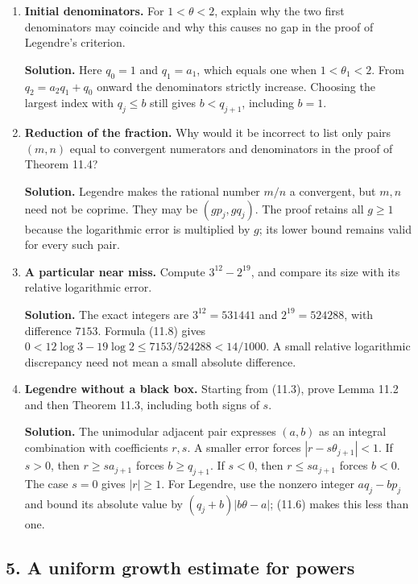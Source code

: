\documentclass[
  11pt,
  a4paper,
]{article}
\begin{document}
\begin{enumerate}
\def\labelenumi{\arabic{enumi}.}
\item
  \textbf{Initial denominators.} For \(1<\theta<2\), explain why the two
  first denominators may coincide and why this causes no gap in the
  proof of Legendre's criterion.

  \textbf{Solution.} Here \(q_0=1\) and \(q_1=a_1\), which equals one
  when \(1<\theta_1<2\). From \(q_2=a_2q_1+q_0\) onward the denominators
  strictly increase. Choosing the largest index with \(q_j\le b\) still
  gives \(b<q_{j+1}\), including \(b=1\).
\item
  \textbf{Reduction of the fraction.} Why would it be incorrect to list
  only pairs \((m,n)\) equal to convergent numerators and denominators
  in the proof of Theorem 11.4?

  \textbf{Solution.} Legendre makes the rational number \(m/n\) a
  convergent, but \(m,n\) need not be coprime. They may be
  \((gp_j,gq_j)\). The proof retains all \(g\ge1\) because the
  logarithmic error is multiplied by \(g\); its lower bound remains
  valid for every such pair.
\item
  \textbf{A particular near miss.} Compute \(3^{12}-2^{19}\), and
  compare its size with its relative logarithmic error.

  \textbf{Solution.} The exact integers are \(3^{12}=531441\) and
  \(2^{19}=524288\), with difference \(7153\). Formula (11.8) gives
  \(0<12\log3-19\log2\le7153/524288<14/1000\). A small relative
  logarithmic discrepancy need not mean a small absolute difference.
\item
  \textbf{Legendre without a black box.} Starting from (11.3), prove
  Lemma 11.2 and then Theorem 11.3, including both signs of \(s\).

  \textbf{Solution.} The unimodular adjacent pair expresses \((a,b)\) as
  an integral combination with coefficients \(r,s\). A smaller error
  forces \(|r-s\theta_{j+1}|<1\). If \(s>0\), then \(r\ge s a_{j+1}\)
  forces \(b\ge q_{j+1}\). If \(s<0\), then \(r\le s a_{j+1}\) forces
  \(b<0\). The case \(s=0\) gives \(|r|\ge1\). For Legendre, use the
  nonzero integer \(a q_j-b p_j\) and bound its absolute value by
  \((q_j+b)|b\theta-a|\); (11.6) makes this less than one.
\end{enumerate}

\subsection{5. A uniform growth estimate for
powers}\label{a-uniform-growth-estimate-for-powers}
\end{document}
